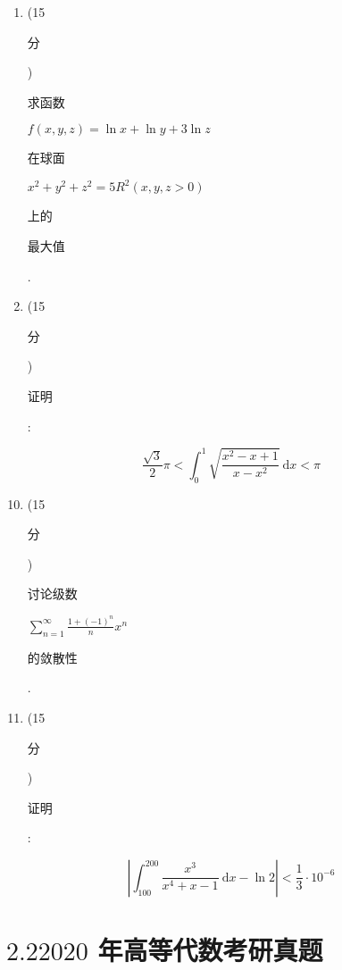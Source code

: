 \documentclass[10pt]{article}
\begin{document}
\begin{enumerate}
  \item (15 \begin{CJK}{UTF8}{mj}分\end{CJK}) \begin{CJK}{UTF8}{mj}求函数\end{CJK} $f(x, y, z)=\ln x+\ln y+3 \ln z$ \begin{CJK}{UTF8}{mj}在球面\end{CJK} $x^{2}+y^{2}+z^{2}=5 R^{2}(x, y, z>0)$ \begin{CJK}{UTF8}{mj}上的\end{CJK} \begin{CJK}{UTF8}{mj}最大值\end{CJK}.

  \item (15 \begin{CJK}{UTF8}{mj}分\end{CJK}) \begin{CJK}{UTF8}{mj}证明\end{CJK}:

\end{enumerate}
$$
\frac{\sqrt{3}}{2} \pi<\int_{0}^{1} \sqrt{\frac{x^{2}-x+1}{x-x^{2}}} \mathrm{~d} x<\pi
$$

\begin{enumerate}
  \setcounter{enumi}{9}
  \item (15 \begin{CJK}{UTF8}{mj}分\end{CJK}) \begin{CJK}{UTF8}{mj}讨论级数\end{CJK} $\sum_{n=1}^{\infty} \frac{1+(-1)^{n}}{n} x^{n}$ \begin{CJK}{UTF8}{mj}的敛散性\end{CJK}.

  \item (15 \begin{CJK}{UTF8}{mj}分\end{CJK}) \begin{CJK}{UTF8}{mj}证明\end{CJK}:

\end{enumerate}
$$
\left|\int_{100}^{200} \frac{x^{3}}{x^{4}+x-1} \mathrm{~d} x-\ln 2\right|<\frac{1}{3} \cdot 10^{-6}
$$

\section{$2.22020$ 年高等代数考研真题}
\end{document}
